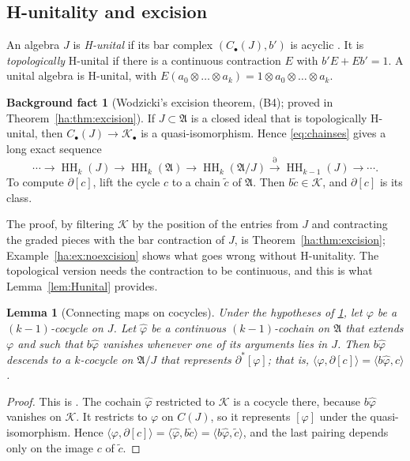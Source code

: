 \documentclass[11pt,oneside,reqno]{article}
\DeclareMathOperator{\HH}{HH}
\newcommand{\cK}{\mathcal K}
\theoremstyle{plain}
\newtheorem{lemma}[theorem]{Lemma}
\theoremstyle{definition}
\newtheorem{background}[theorem]{Background fact}
\theoremstyle{remark}
\begin{document}
\subsection{H-unitality and excision}\label{subsec:excision}
An algebra \(J\) is \emph{H-unital} if its bar complex \((C_\bullet(J),b')\)
is acyclic \cite{Wodzicki}. It is \emph{topologically} H-unital if there is
a continuous contraction \(E\) with \(b'E+Eb'=1\). A unital algebra is
H-unital, with \(E(a_0\otimes\dots\otimes a_k)=1\otimes a_0\otimes\dots
\otimes a_k\).

\begin{background}[Wodzicki's excision theorem, (B4); proved in Theorem~\ref{ha:thm:excision}]\label{bg:excision}
If \(J\subset\mathfrak A\) is a closed ideal that is topologically
H-unital, then \(C_\bullet(J)\to\cK_\bullet\) is a quasi-isomorphism. Hence
\eqref{eq:chainses} gives a long exact sequence
\[
 \cdots\to\HH_k(J)\to\HH_k(\mathfrak A)\to\HH_k(\mathfrak A/J)
 \xrightarrow{\partial}\HH_{k-1}(J)\to\cdots .
\]
To compute \(\partial[c]\), lift the cycle \(c\) to a chain \(\tilde c\) of
\(\mathfrak A\). Then \(b\tilde c\in\cK\), and \(\partial[c]\) is its
class.
\end{background}

The proof, by filtering \(\cK\) by the position of the entries from \(J\)
and contracting the graded pieces with the bar contraction of \(J\), is
Theorem~\ref{ha:thm:excision}; Example~\ref{ha:ex:noexcision} shows what
goes wrong without H-unitality. The topological version needs the
contraction to be continuous, and this is what Lemma~\ref{lem:Hunital}
provides.

\begin{lemma}[Connecting maps on cocycles]\label{lem:conn}
Under the hypotheses of \ref{bg:excision}, let \(\varphi\) be a
\((k-1)\)-cocycle on \(J\). Let \(\hat\varphi\) be a continuous
\((k-1)\)-cochain on \(\mathfrak A\) that extends \(\varphi\) and such that
\(b\hat\varphi\) vanishes whenever one of its arguments lies in \(J\). Then
\(b\hat\varphi\) descends to a \(k\)-cocycle on \(\mathfrak A/J\) that
represents \(\partial^*[\varphi]\); that is,
\(\langle\varphi,\partial[c]\rangle=\langle b\hat\varphi,c\rangle\).
\end{lemma}

\begin{proof}
This is \cite[Lemma ``Connecting maps on cocycles'']{HHb}. The cochain
\(\hat\varphi\) restricted to \(\cK\) is a cocycle there, because
\(b\hat\varphi\) vanishes on \(\cK\). It restricts to \(\varphi\) on
\(C(J)\), so it represents \([\varphi]\) under the quasi-isomorphism. Hence
\(\langle\varphi,\partial[c]\rangle=\langle\hat\varphi,b\tilde c\rangle=
\langle b\hat\varphi,\tilde c\rangle\), and the last pairing depends only on
the image \(c\) of \(\tilde c\).
\end{proof}
\end{document}
